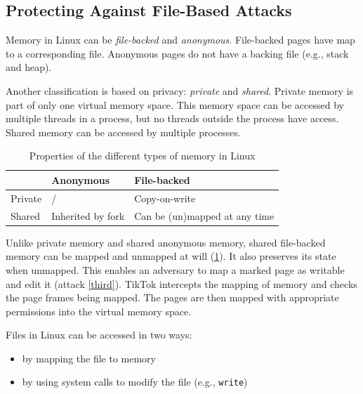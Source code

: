 \subsection{Protecting Against File-Based Attacks}
\label{subsec:filewrites}
Memory in Linux can be  \emph{file-backed} and \emph{anonymous}. File-backed 
pages have  map to a corresponding file. Anonymous pages do not have a backing 
file (e.g., stack and heap).

Another classification is based on privacy: \emph{private} and \emph{shared}. 
Private memory is part of only one virtual memory space. This memory space can 
be accessed by multiple threads in a process, but no threads outside the process
have access. Shared memory can be accessed by multiple processes.

\begin{table}[]
  \begin{tabular}{|l|l|l|}
  \hline
          & Anonymous         & File-backed                           \\ \hline
    Private & /                  & Copy-on-write                         \\ \hline
    Shared  & Inherited by fork & Can be (un)mapped at any time         \\ \hline
  \end{tabular}
  \caption{Properties of the different types of memory in Linux}
  \label{tab:memory}
\end{table}

Unlike private memory and shared anonymous memory, shared file-backed memory can
be mapped and unmapped at will (\cref{tab:memory}). It also preserves its state
when unmapped. This enables an adversary to map a marked page as writable and
edit it (attack \ref{third}). TikTok intercepts the mapping of memory and checks the
page frames being mapped. The pages are then mapped with appropriate permissions
into the virtual memory space.

Files in Linux can be accessed in two ways:
\begin{itemize}
    \item by mapping the file to memory
    \item by using system calls to modify the file (e.g., \texttt{write})
\end{itemize}

